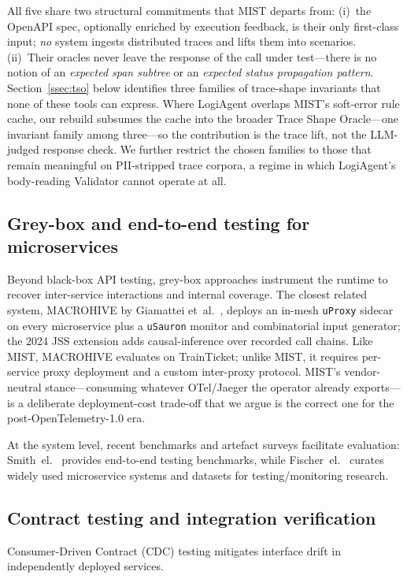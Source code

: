 \documentclass[conference]{IEEEtran}
\begin{document}
All five share two structural commitments that \textsc{MIST} departs
from: (i)~the OpenAPI spec, optionally enriched by execution feedback,
is their only first-class input; \emph{no} system ingests distributed
traces and lifts them into scenarios.  (ii)~Their oracles never leave
the response of the call under test---there is no notion of an
\emph{expected span subtree} or an \emph{expected status propagation
pattern}.  Section~\ref{ssec:tso} below identifies three families of
trace-shape invariants that none of these tools can express.  Where
LogiAgent overlaps \textsc{MIST}'s soft-error rule cache, our rebuild
subsumes the cache into the broader Trace Shape Oracle---one invariant
family among three---so the contribution is the trace lift, not the
LLM-judged response check.  We further restrict the chosen families to
those that remain meaningful on PII-stripped trace corpora, a regime in
which LogiAgent's body-reading Validator cannot operate at all.

\subsection{Grey-box and end-to-end testing for microservices}
Beyond black-box API testing, grey-box approaches instrument the runtime to recover inter-service interactions and internal coverage.
The closest related system, \textsc{MACROHIVE} by Giamattei et~al.~\cite{giamattei2022macrohive,giamattei2024macrohive},
deploys an in-mesh \texttt{uProxy} sidecar on every microservice plus a
\texttt{uSauron} monitor and combinatorial input generator; the 2024
JSS extension adds causal-inference over recorded call chains.  Like
\textsc{MIST}, \textsc{MACROHIVE} evaluates on TrainTicket; unlike
\textsc{MIST}, it requires per-service proxy deployment and a custom
inter-proxy protocol.  \textsc{MIST}'s vendor-neutral stance---consuming
whatever OTel/Jaeger the operator already exports---is a deliberate
deployment-cost trade-off that we argue is the correct one for the
post-OpenTelemetry-1.0 era.

At the system level, recent benchmarks and artefact surveys facilitate evaluation: Smith~el.~\cite{smith2023e2e-benchmark} provides end-to-end testing benchmarks, while Fischer~el.~\cite{fischer2024overview} curates widely used microservice systems and datasets for testing/monitoring research.

\subsection{Contract testing and integration verification}
Consumer-Driven Contract (CDC) testing mitigates interface drift in independently deployed services. 
\end{document}
